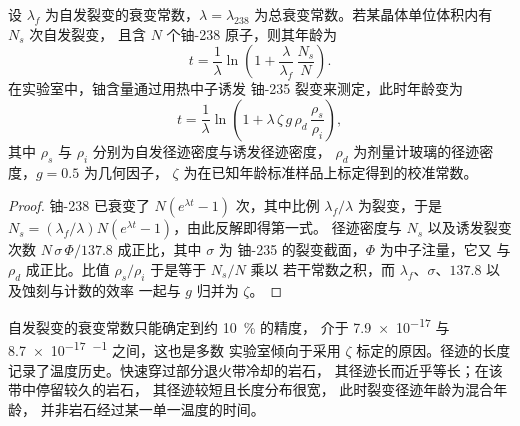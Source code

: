 \begin{theorem}[裂变径迹年龄]\label{thm:b3:advanced-geochronology:fission-track}
设 $\lambda_f$ 为自发裂变的衰变常数，$\lambda =
\lambda_{238}$ 为总衰变常数。若某晶体单位体积内有 $N_s$ 次自发裂变，
且含 $N$ 个铀-238 原子，则其年龄为
\[
t = \frac1\lambda\ln\left(1 + \frac{\lambda}{\lambda_f}\,\frac{N_s}{N}\right).
\]
在实验室中，铀含量通过用热中子诱发
铀-235 裂变来测定，此时年龄变为
\[
t = \frac1\lambda\ln\left(1 + \lambda\,\zeta\,g\,\rho_d\,\frac{\rho_s}{\rho_i}\right),
\]
其中 $\rho_s$ 与 $\rho_i$ 分别为自发径迹密度与诱发径迹密度，
$\rho_d$ 为剂量计玻璃的径迹密度，$g = 0.5$ 为几何因子，
$\zeta$ 为在已知年龄标准样品上标定得到的校准常数。
\end{theorem}

\begin{proof}
铀-238 已衰变了 $N(e^{\lambda t} - 1)$ 次，其中比例
$\lambda_f/\lambda$ 为裂变，于是 $N_s =
(\lambda_f/\lambda)N(e^{\lambda t} - 1)$，由此反解即得第一式。
径迹密度与 $N_s$ 以及诱发裂变次数
$N\,\sigma\,\Phi/137.8$ 成正比，其中 $\sigma$ 为
铀-235 的裂变截面，$\Phi$ 为中子注量，它又
与 $\rho_d$ 成正比。比值 $\rho_s/\rho_i$ 于是等于 $N_s/N$ 乘以
若干常数之积，而 $\lambda_f$、$\sigma$、$137.8$ 以及蚀刻与计数的效率
一起与 $g$ 归并为 $\zeta$。
\end{proof}

自发裂变的衰变常数只能确定到约 \qty{10}{\percent} 的精度，
介于 \num{7.9e-17} 与 \qty{8.7e-17}{^{-1}} 之间，这也是多数
实验室倾向于采用 $\zeta$ 标定的原因。径迹的长度
记录了温度历史。快速穿过部分退火带冷却的岩石，
其径迹长而近乎等长；在该带中停留较久的岩石，
其径迹较短且长度分布很宽，
此时裂变径迹年龄为混合年龄，
并非岩石经过某一单一温度的时间。

